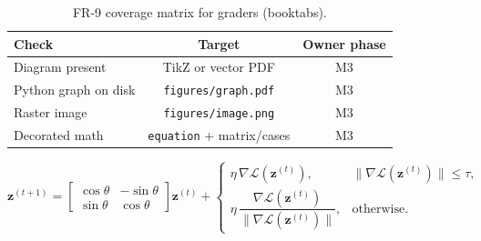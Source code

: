 \begin{table}[htbp]
\centering
\begin{tabular}{@{}lcc@{}}
\toprule
\textbf{Check} & \textbf{Target} & \textbf{Owner phase} \\
\midrule
Diagram present & TikZ or vector PDF & M3 \\
Python graph on disk & \texttt{figures/graph.pdf} & M3 \\
Raster image & \texttt{figures/image.png} & M3 \\
Decorated math & \texttt{equation} + matrix/cases & M3 \\
\bottomrule
\end{tabular}
\caption{FR-9 coverage matrix for graders (booktabs).}
\label{tab:requirements}
\end{table}

\begin{equation}
\label{eq:normalized}
\mathbf{z}^{(t+1)} =
\begin{bmatrix}
\cos\theta & -\sin\theta \\
\sin\theta & \cos\theta
\end{bmatrix}
\mathbf{z}^{(t)}
+
\begin{cases}
\eta \,\nabla \mathcal{L}(\mathbf{z}^{(t)}), &
\lVert \nabla \mathcal{L}(\mathbf{z}^{(t)}) \rVert \le \tau, \\[6pt]
\eta \,\dfrac{\nabla \mathcal{L}(\mathbf{z}^{(t)})}
{\lVert \nabla \mathcal{L}(\mathbf{z}^{(t)}) \rVert}, &
\text{otherwise.}
\end{cases}
\end{equation}
